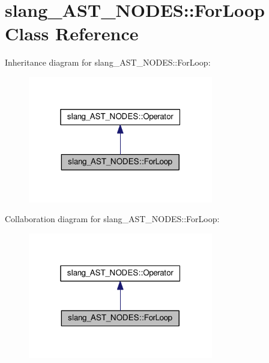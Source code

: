 \hypertarget{classslang__AST__NODES_1_1ForLoop}{}\section{slang\+\_\+\+A\+S\+T\+\_\+\+N\+O\+D\+ES\+:\+:For\+Loop Class Reference}
\label{classslang__AST__NODES_1_1ForLoop}


Inheritance diagram for slang\+\_\+\+A\+S\+T\+\_\+\+N\+O\+D\+ES\+:\+:For\+Loop\+:
\nopagebreak
\begin{figure}[H]
\begin{center}
\leavevmode
\includegraphics[width=229pt]{classslang__AST__NODES_1_1ForLoop__inherit__graph}
\end{center}
\end{figure}


Collaboration diagram for slang\+\_\+\+A\+S\+T\+\_\+\+N\+O\+D\+ES\+:\+:For\+Loop\+:
\nopagebreak
\begin{figure}[H]
\begin{center}
\leavevmode
\includegraphics[width=229pt]{classslang__AST__NODES_1_1ForLoop__coll__graph}
\end{center}
\end{figure}
